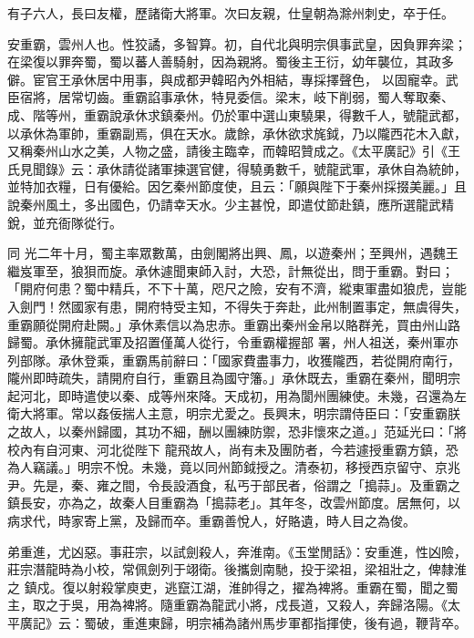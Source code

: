\begin{pinyinscope}
 有子六人，長曰友權，歷諸衛大將軍。次曰友親，仕皇朝為滁州刺史，卒于任。



 安重霸，雲州人也。性狡譎，多智算。初，自代北與明宗俱事武皇，因負罪奔梁；在梁復以罪奔蜀，蜀以蕃人善騎射，因為親將。蜀後主王衍，幼年襲位，其政多僻。宦官王承休居中用事，與成都尹韓昭內外相結，專採擇聲色，
 以固寵幸。武臣宿將，居常切齒。重霸諂事承休，特見委信。梁末，岐下削弱，蜀人奪取秦、成、階等州，重霸說承休求鎮秦州。仍於軍中選山東驍果，得數千人，號龍武都，以承休為軍帥，重霸副焉，俱在天水。歲餘，承休欲求旄鉞，乃以隴西花木入獻，又稱秦州山水之美，人物之盛，請後主臨幸，而韓昭贊成之。《太平廣記》引《王氏見聞錄》云：承休請從諸軍揀選官健，得驍勇數千，號龍武軍，承休自為統帥，並特加衣糧，日有優給。因乞秦州節度使，且云：「願與陛下于秦州採掇美麗。」且說秦州風土，多出國色，仍請幸天水。少主甚悅，即遣仗節赴鎮，應所選龍武精銳，並充衙隊從行。



 同
 光二年十月，蜀主率眾數萬，由劍閣將出興、鳳，以遊秦州；至興州，遇魏王繼岌軍至，狼狽而旋。承休遽聞東師入討，大恐，計無從出，問于重霸。對曰；「開府何患？蜀中精兵，不下十萬，咫尺之險，安有不濟，縱東軍盡如狼虎，豈能入劍門！然國家有患，開府特受主知，不得失于奔赴，此州制置事定，無虞得失，重霸願從開府赴闕。」承休素信以為忠赤。重霸出秦州金帛以賂群羌，買由州山路歸蜀。承休擁龍武軍及招置僅萬人從行，令重霸權握部
 署，州人祖送，秦州軍亦列部隊。承休登乘，重霸馬前辭曰：「國家費盡事力，收獲隴西，若從開府南行，隴州即時疏失，請開府自行，重霸且為國守籓。」承休既去，重霸在秦州，聞明宗起河北，即時遣使以秦、成等州來降。天成初，用為閬州團練使。未幾，召還為左衛大將軍。常以姦佞揣人主意，明宗尤愛之。長興末，明宗謂侍臣曰：「安重霸朕之故人，以秦州歸國，其功不細，酬以團練防禦，恐非懷來之道。」范延光曰：「將校內有自河東、河北從陛下
 龍飛故人，尚有未及團防者，今若遽授重霸方鎮，恐為人竊議。」明宗不悅。未幾，竟以同州節鉞授之。清泰初，移授西京留守、京兆尹。先是，秦、雍之間，令長設酒食，私丐于部民者，俗謂之「搗蒜」。及重霸之鎮長安，亦為之，故秦人目重霸為「搗蒜老」。其年冬，改雲州節度。居無何，以病求代，時家寄上黨，及歸而卒。重霸善悅人，好賂遺，時人目之為俊。



 弟重進，尤凶惡。事莊宗，以試劍殺人，奔淮南。《玉堂閒話》：安重進，性凶險，莊宗潛龍時為小校，常佩劍列于翊衛。後攜劍南馳，投于梁祖，梁祖壯之，俾隸淮之
 鎮戍。復以射殺掌庾吏，逃竄江湖，淮帥得之，擢為裨將。重霸在蜀，聞之蜀主，取之于吳，用為裨將。隨重霸為龍武小將，戍長道，又殺人，奔歸洛陽。《太平廣記》云：蜀破，重進東歸，明宗補為諸州馬步軍都指揮使，後有過，鞭背卒。




\end{pinyinscope}
